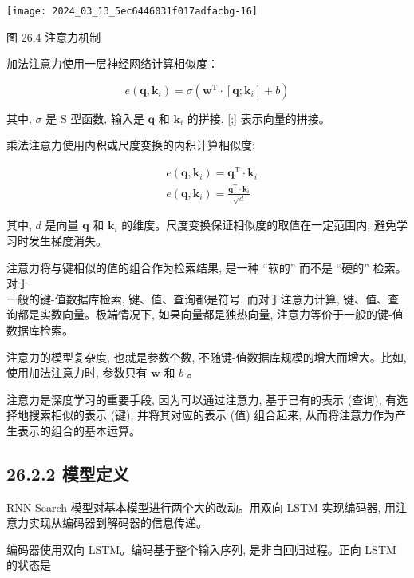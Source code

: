 \documentclass[10pt]{article}
\begin{document}
\begin{center}
\texttt{[image: 2024\_03\_13\_5ec6446031f017adfacbg-16]}
\end{center}

图 26.4 注意力机制

加法注意力使用一层神经网络计算相似度：


\begin{equation*}
e\left(\boldsymbol{q}, \boldsymbol{k}_{i}\right)=\sigma\left(\boldsymbol{w}^{\mathrm{T}} \cdot\left[\boldsymbol{q} ; \boldsymbol{k}_{i}\right]+b\right) \tag{26.10}
\end{equation*}


其中, $\sigma$ 是 $\mathrm{S}$ 型函数, 输入是 $\boldsymbol{q}$ 和 $\boldsymbol{k}_{i}$ 的拼接, [;] 表示向量的拼接。

乘法注意力使用内积或尺度变换的内积计算相似度:


\begin{align*}
& e\left(\boldsymbol{q}, \boldsymbol{k}_{i}\right)=\boldsymbol{q}^{\mathrm{T}} \cdot \boldsymbol{k}_{i}  \tag{26.11}\\
& e\left(\boldsymbol{q}, \boldsymbol{k}_{i}\right)=\frac{\boldsymbol{q}^{\mathrm{T}} \cdot \boldsymbol{k}_{i}}{\sqrt{d}} \tag{26.12}
\end{align*}


其中, $d$ 是向量 $\boldsymbol{q}$ 和 $\boldsymbol{k}_{i}$ 的维度。尺度变换保证相似度的取值在一定范围内, 避免学习时发生梯度消失。

注意力将与键相似的值的组合作为检索结果, 是一种 “软的” 而不是 “硬的” 检索。对于\\
一般的键-值数据库检索, 键、值、查询都是符号, 而对于注意力计算, 键、值、查询都是实数向量。极端情况下, 如果向量都是独热向量, 注意力等价于一般的键-值数据库检索。

注意力的模型复杂度, 也就是参数个数, 不随键-值数据库规模的增大而增大。比如, 使用加法注意力时, 参数只有 $\boldsymbol{w}$ 和 $b$ 。

注意力是深度学习的重要手段, 因为可以通过注意力, 基于已有的表示 (查询), 有选择地搜索相似的表示 (键), 并将其对应的表示 (值) 组合起来, 从而将注意力作为产生表示的组合的基本运算。

\subsection*{26.2.2 模型定义}
RNN Search 模型对基本模型进行两个大的改动。用双向 LSTM 实现编码器, 用注意力实现从编码器到解码器的信息传递。

编码器使用双向 LSTM。编码基于整个输入序列, 是非自回归过程。正向 LSTM 的状态是
\end{document}
